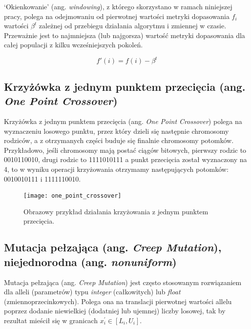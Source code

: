 \documentclass[a4paper,11pt]{article}
\begin{document}
    \bigskip

    `Okienkowanie' (ang. \textit{windowing}), z którego skorzystano w ramach niniejszej pracy, polega na odejmowaniu od pierwotnej wartości metryki dopasowania  $f_{i}$ wartości $\beta^{t}$ zależnej od przebiegu działania algorytmu i zmiennej w czasie. Przeważnie jest to najmniejsza (lub najgorsza) wartość metryki dopasowania dla całej populacji z kilku wcześniejszych pokoleń\cite{IntroductionToEvolutionaryComputing2015}.

    \bigskip

    \begin{equation}
        \label{eq:new_fitness}
        f'(i) = f(i) - \beta^{t}
    \end{equation}

    \subsection{Krzyżówka z jednym punktem przecięcia (ang. \textit{One Point Crossover})}

    Krzyżówka z jednym punktem przecięcia (ang. \textit{One Point Crossover}) polega na wyznaczeniu losowego punktu, przez który dzieli się następnie chromosomy rodziców, a z otrzymanych części buduje się finalnie chromosomy potomków. Przykładowo, jeśli chromosomy mają postać ciągów bitowych, pierwszy rodzic to 0010110010, drugi rodzic to 1111010111 a punkt przecięcia został wyznaczony na 4, to w wyniku operacji krzyżowania otrzymamy następujących potomków: 0010010111 i 1111110010\cite{GeneticAlgorithmEssentials2017}.

    \bigskip

    \begin{figure}[H]
        \label{fig:one_point_crossover}
        \centering
        \texttt{[image: one\_point\_crossover]}
        \caption{Obrazowy przykład działania krzyżowania z jednym punktem przecięcia.}
    \end{figure}

    \subsection{Mutacja pełzająca (ang. \textit{Creep Mutation}), niejednorodna (ang. \textit{nonuniform})}

    Mutacja pełzająca (ang. \textit{Creep Mutation}) jest często stosowanym rozwiązaniem dla alleli (parametrów) typu \textit{integer} (całkowitych) lub \textit{float} (zmiennoprzecinkowych). Polega ona na translacji pierwotnej wartości allelu poprzez dodanie niewielkiej (dodatniej lub ujemnej) liczby losowej, tak by rezultat mieścił się w granicach $x_{i}^{'} \in [L_{i}, U_{i}]$\cite{IntroductionToEvolutionaryComputing2015}.
\end{document}
